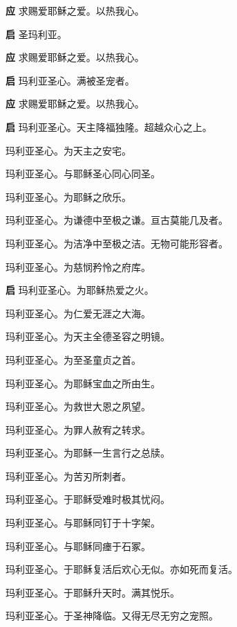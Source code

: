 \documentclass[UTF8,17pt]{ctexart}
\begin{document}
\textbf{应} \quad 求赐爱耶稣之爱。以热我⼼。

\textbf{启} \quad 圣玛利亚。

\textbf{应} \quad 求赐爱耶稣之爱。以热我⼼。

\textbf{启} \quad 玛利亚圣⼼。满被圣宠者。

\textbf{应} \quad 求赐爱耶稣之爱。以热我⼼。

\textbf{启} \quad 玛利亚圣⼼。天主降福独隆。超越众⼼之上。

 玛利亚圣⼼。为天主之安宅。

 玛利亚圣⼼。与耶稣圣⼼同⼼同圣。

 玛利亚圣⼼。为耶稣之欣乐。

 玛利亚圣⼼。为谦德中⾄极之谦。亘古莫能⼏及者。

 玛利亚圣⼼。为洁净中⾄极之洁。⽆物可能形容者。

 玛利亚圣⼼。为慈悯矜怜之府库。

\textbf{启} \quad 玛利亚圣⼼。为耶稣热爱之⽕。

 玛利亚圣⼼。为仁爱⽆涯之⼤海。

 玛利亚圣⼼。为天主全德圣容之明镜。

 玛利亚圣⼼。为⾄圣童贞之⾸。

 玛利亚圣⼼。为耶稣宝⾎之所由⽣。

 玛利亚圣⼼。为救世⼤恩之夙望。

 玛利亚圣⼼。为罪⼈赦宥之转求。

 玛利亚圣⼼。为耶稣⼀⽣⾔⾏之总牍。

 玛利亚圣⼼。为苦刃所刺者。

 玛利亚圣⼼。于耶稣受难时极其忧闷。

 玛利亚圣⼼。与耶稣同钉于⼗字架。

 玛利亚圣⼼。与耶稣同瘗于⽯冢。

 玛利亚圣⼼。于耶稣复活后欢⼼⽆似。亦如死⽽复活。

 玛利亚圣⼼。于耶稣升天时。满其悦乐。

 玛利亚圣⼼。于圣神降临。又得⽆尽⽆穷之宠照。
\end{document}
